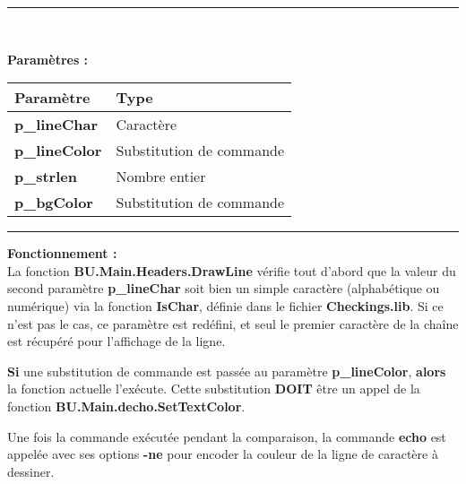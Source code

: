 \documentclass[a4paper,10pt]{article}
\begin{document}

\par\noindent\rule{\textwidth}{0.4pt}\\

\begin{justify}
    \textbf{Paramètres :}

    \begin{tabular}{|l|l|}
        \hline
        \textbf{Paramètre} & \textbf{Type}\\
        \hline
        \textbf{\color{vars}p\_lineChar} & Caractère\\
        \hline
        \textbf{\color{vars}p\_lineColor} & Substitution de commande\\
        \hline
        \textbf{\color{vars}p\_strlen} & Nombre entier\\
        \hline
        \textbf{\color{vars}p\_bgColor} & Substitution de commande\\
        \hline
    \end{tabular}
\end{justify}

\setlength{\parskip}{2em}


\par\noindent\rule{\textwidth}{0.4pt}\setlength{\parskip}{1em}

\begin{justify}
    \textbf{Fonctionnement :}\\[1\baselineskip]
    La fonction \textbf{\color{func}BU.Main.Headers.DrawLine} vérifie tout d'abord que la valeur du second paramètre \textbf{\color{vars}p\_lineChar} soit bien un simple caractère (alphabétique ou numérique) via la fonction \textbf{\color{func}IsChar}, définie dans le fichier \textbf{\color{path}Checkings.lib}. Si ce n'est pas le cas, ce paramètre est redéfini, et seul le premier caractère de la chaîne est récupéré pour l'affichage de la ligne.
\end{justify}

\begin{justify}
    \textbf{\color{cond}Si} une substitution de commande est passée au paramètre \textbf{\color{vars}p\_lineColor}, \textbf{\color{cond}alors} la fonction actuelle l'exécute. Cette substitution \textbf{DOIT} être un appel de la fonction \textbf{\color{func}BU.Main.decho.SetTextColor}.
\end{justify}

\begin{justify}
    Une fois la commande exécutée pendant la comparaison, la commande \textbf{\color{cmds}echo} est appelée avec ses options \textbf{\color{cmds}-ne} pour encoder la couleur de la ligne de caractère à dessiner.
\end{justify}
\end{document}
